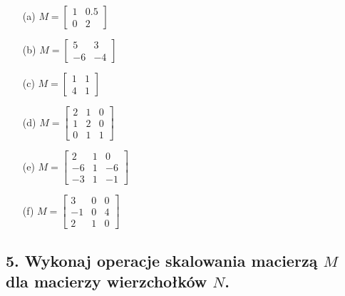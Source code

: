 \begin{enumerate}
    \item[(a)] \( M = \begin{bmatrix} 1 & 0.5 \\ 0 & 2 \end{bmatrix} \)
    
    \item[(b)] \( M = \begin{bmatrix} 5 & 3 \\ -6 & -4 \end{bmatrix} \)
    
    \item[(c)] \( M = \begin{bmatrix} 1 & 1 \\ 4 & 1 \end{bmatrix} \)
    
    \item[(d)] \( M = \begin{bmatrix} 2 & 1 & 0 \\ 1 & 2 & 0 \\ 0 & 1 & 1 \end{bmatrix} \)
    
    \item[(e)] \( M = \begin{bmatrix} 2 & 1 & 0 \\ -6 & 1 & -6 \\ -3 & 1 & -1 \end{bmatrix} \)
    
    \item[(f)] \( M = \begin{bmatrix} 3 & 0 & 0 \\ -1 & 0 & 4 \\ 2 & 1 & 0 \end{bmatrix} \)
\end{enumerate}

\subsection*{5. Wykonaj operacje skalowania macierzą \( M \) dla macierzy wierzchołków \( N \).}

